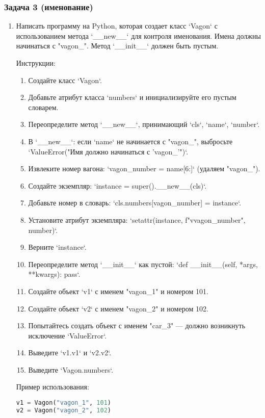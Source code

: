 \subsubsection{Задача 3 (именование)}

\begin{enumerate}
\item Написать программу на Python, которая создает класс `Vagon` с использованием метода `\_\_new\_\_` для контроля именования. Имена должны начинаться с "vagon\_". Метод `\_\_init\_\_` должен быть пустым.

Инструкции:
\begin{enumerate}
    \item Создайте класс `Vagon`.
    \item Добавьте атрибут класса `numbers` и инициализируйте его пустым словарем.
    \item Переопределите метод `\_\_new\_\_`, принимающий `cls`, `name`, `number`.
    \item В `\_\_new\_\_`: если `name` не начинается с "vagon\_", выбросьте `ValueError("Имя должно начинаться с 'vagon\_'")`.
    \item Извлеките номер вагона: `vagon\_number = name[6:]` (удаляем "vagon\_").
    \item Создайте экземпляр: `instance = super().\_\_new\_\_(cls)`.
    \item Добавьте номер в словарь: `cls.numbers[vagon\_number] = instance`.
    \item Установите атрибут экземпляра: `setattr(instance, f"v{vagon\_number}", number)`.
    \item Верните `instance`.
    \item Переопределите метод `\_\_init\_\_` как пустой: `def \_\_init\_\_(self, *args, **kwargs): pass`.
    \item Создайте объект `v1` с именем "vagon\_1" и номером 101.
    \item Создайте объект `v2` с именем "vagon\_2" и номером 102.
    \item Попытайтесь создать объект с именем "car\_3" — должно возникнуть исключение `ValueError`.
    \item Выведите `v1.v1` и `v2.v2`.
    \item Выведите `Vagon.numbers`.
\end{enumerate}

Пример использования:
\begin{lstlisting}[language=Python]
v1 = Vagon("vagon_1", 101)
v2 = Vagon("vagon_2", 102)


\end{lstlisting}
\end{enumerate}
